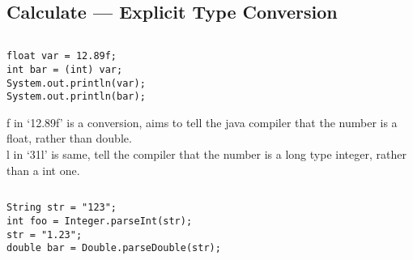 \documentclass[en, 11pt, xcolor=dvipsnames]{beamer}
\begin{document}
\subsection{Calculate --- Explicit Type Conversion}
\begin{frame}[fragile]



	\begin{columns}[c]
		\begin{column}{0.9\textwidth}

			\begin{lstlisting}[style=Java]
float var = 12.89f;
int bar = (int) var;
System.out.println(var);
System.out.println(bar);\end{lstlisting}

			f in `12.89f' is a conversion, aims to tell the java compiler
			that the number is a float, rather than double.\\

			l in `31l' is same, tell the compiler that the number is a long type
			integer, rather than a int one.

		\end{column}
	\end{columns}

\end{frame}
\begin{frame}[fragile]


	\begin{columns}[c]
		\begin{column}{0.9\textwidth}

			\begin{lstlisting}[style=Java]
String str = "123";
int foo = Integer.parseInt(str);
str = "1.23";
double bar = Double.parseDouble(str);
      \end{lstlisting}

		\end{column}
	\end{columns}

\end{frame}
\end{document}

